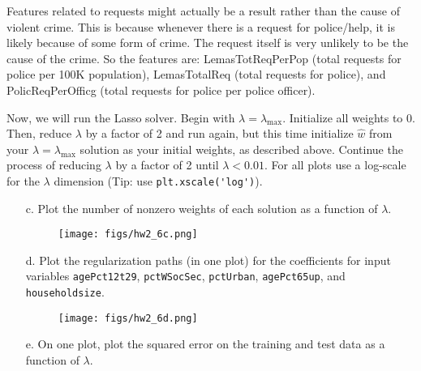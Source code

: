 \documentclass{article}
\begin{document}
\begin{aprob}
\begin{enumerate}
        Features related to requests might actually be a result rather than the cause of violent crime. This is because whenever there is a request for police/help, it is likely because of some form of crime. The request itself is very unlikely to be the cause of the crime. So the features are: LemasTotReqPerPop (total requests for police per 100K population), LemasTotalReq (total requests for police), and PolicReqPerOfficg (total requests for police per police officer).
        
    \end{enumerate}

    Now, we will run the Lasso solver. Begin with $\lambda = \lambda_{\max}$. Initialize all weights to $0$. Then, reduce $\lambda$ by a factor of 2 and run again, but this time initialize $\hat{{w}}$ from your $\lambda = \lambda_{\max}$ solution as your initial weights, as described above. Continue the process of reducing $\lambda$ by a factor of 2 until $\lambda < 0.01$.
    For all plots use a log-scale for the $\lambda$ dimension (Tip: use
    \verb|plt.xscale('log')|).
    \\
    
    
    \begin{enumerate}
        \item[c.]  Plot the number of nonzero weights of each solution as a function of $\lambda$.
        
        \begin{figure}[htp] 
        \centering
        \vspace*{-0.1in}
        \texttt{[image: figs/hw2\_6c.png]}
        \label{figs:hw2_6c.png}
        \end{figure}
        
        \item[d.]  Plot the regularization paths (in one plot) for the coefficients for input variables \texttt{agePct12t29}, \texttt{pctWSocSec}, \texttt{pctUrban}, \texttt{agePct65up}, and \texttt{householdsize}.
        
        \begin{figure}[htp] 
        \centering
        \vspace*{-0.1in}
        \texttt{[image: figs/hw2\_6d.png]}
        \label{figs:hw2_6d.png}
        \end{figure}
        
        \item[e.]  On one plot, plot the squared error on the training and test data as a function of $\lambda$.
        

\end{enumerate}
\end{aprob}
\end{document}
